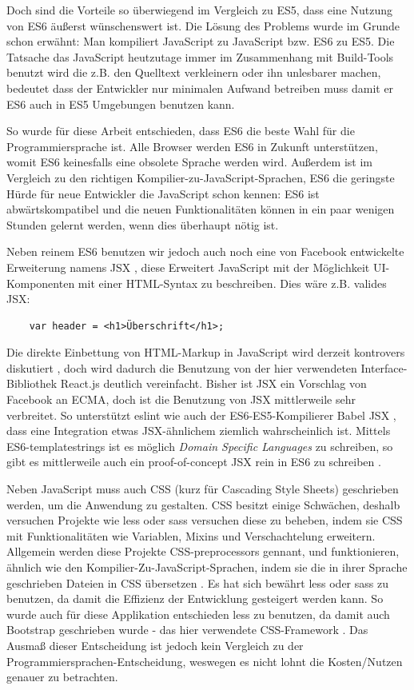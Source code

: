 \documentclass[12pt,twoside]{book}
\begin{document}
Doch sind die Vorteile so überwiegend im Vergleich zu ES5, dass eine Nutzung von ES6 äußerst wünschenswert ist.
Die Lösung des Problems wurde im Grunde schon erwähnt: Man kompiliert JavaScript zu JavaScript bzw. ES6 zu ES5.
Die Tatsache das JavaScript heutzutage immer im Zusammenhang mit Build-Tools benutzt wird die z.B. den Quelltext verkleinern oder ihn unlesbarer machen, bedeutet dass der Entwickler nur minimalen Aufwand betreiben muss damit er ES6 auch in ES5 Umgebungen benutzen kann.

So wurde für diese Arbeit entschieden, dass ES6 die beste Wahl für die Programmiersprache ist. Alle Browser werden ES6 in Zukunft unterstützen, womit ES6 keinesfalls eine obsolete Sprache werden wird. Außerdem ist im Vergleich zu den richtigen Kompilier-zu-JavaScript-Sprachen, ES6 die geringste Hürde für neue Entwickler die JavaScript schon kennen: ES6 ist abwärtskompatibel und die neuen Funktionalitäten können in ein paar wenigen Stunden gelernt werden, wenn dies überhaupt nötig ist.

Neben reinem ES6 benutzen wir jedoch auch noch eine von Facebook entwickelte Erweiterung namens JSX \cite{jsx}, diese Erweitert JavaScript mit der Möglichkeit UI-Komponenten mit einer HTML-Syntax zu beschreiben. Dies wäre z.B. valides JSX:

\begin{verbatim}
    var header = <h1>Überschrift</h1>;
\end{verbatim}

Die direkte Einbettung von HTML-Markup in JavaScript wird derzeit kontrovers diskutiert \cite{jsxcontrovers}, doch wird dadurch die Benutzung von der hier verwendeten Interface-Bibliothek React.js deutlich vereinfacht.
Bisher ist JSX ein Vorschlag von Facebook an ECMA, doch ist die Benutzung von JSX mittlerweile sehr verbreitet. So unterstützt eslint \cite{eslint} wie auch der ES6-ES5-Kompilierer Babel JSX \cite{babel}, dass eine Integration etwas JSX-ähnlichem ziemlich wahrscheinlich ist.
Mittels ES6-templatestrings ist es möglich \textit{Domain Specific Languages} zu schreiben, so gibt es mittlerweile auch ein proof-of-concept JSX rein in ES6 zu schreiben \cite{templatestrings}.

Neben JavaScript muss auch CSS (kurz für Cascading Style Sheets) geschrieben werden, um die Anwendung zu gestalten. CSS besitzt einige Schwächen, deshalb versuchen Projekte wie less oder sass versuchen diese zu beheben, indem sie CSS mit Funktionalitäten wie Variablen, Mixins und Verschachtelung erweitern.
Allgemein werden diese Projekte CSS-preprocessors gennant, und funktionieren,
ähnlich wie den Kompilier-Zu-JavaScript-Sprachen, indem sie die in ihrer Sprache geschrieben Dateien in CSS übersetzen \cite{csspre}.
Es hat sich bewährt less oder sass zu benutzen, da damit die Effizienz der Entwicklung gesteigert werden kann. So wurde auch für diese Applikation entschieden less zu benutzen, da damit auch Bootstrap geschrieben wurde - das hier verwendete CSS-Framework \cite{csspre}.
Das Ausmaß dieser Entscheidung ist jedoch kein Vergleich zu der Programmiersprachen-Entscheidung, weswegen es nicht lohnt die Kosten/Nutzen genauer zu betrachten.
\end{document}
